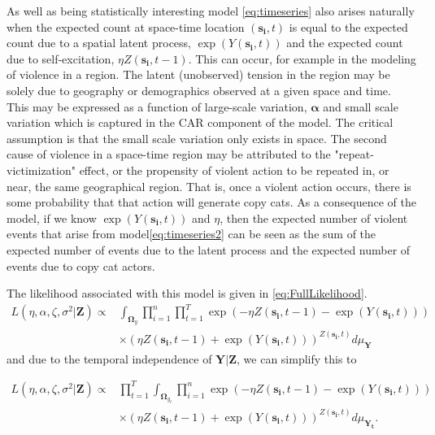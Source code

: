 \documentclass[11pt]{isuthesis}
\begin{document}
	As well as being statistically interesting model \eqref{eq:timeseries} also arises naturally when the expected count at space-time location $(\boldsymbol{s_i},t)$ is equal to the expected count due to a spatial latent process, $\exp(Y(\boldsymbol{s_i},t))$ and the expected count due to self-excitation, $\eta Z(\boldsymbol{s_i},t-1)$. This can occur, for example in the modeling of violence in a region.  The latent (unobserved) tension in the region may be solely due to geography or demographics observed at a given space and time.  This may be expressed as a function of large-scale variation, $\boldsymbol{\alpha}$ and small scale variation which is captured in the CAR component of the model.  The critical assumption is that the small scale variation only exists in space.  The second cause of violence in a space-time region may be attributed to the "repeat-victimization" effect, or the propensity of violent action to be repeated in, or near, the same geographical region.  That is, once a violent action occurs, there is some probability that that action will generate copy cats.  As a consequence of the model, if we know $\exp(Y(\boldsymbol{s_i},t))$ and $\eta$, then the expected number of violent events that arise from model\eqref{eq:timeseries2} can be seen as the sum of the expected number of events due to the latent process and the expected number of events due to copy cat actors.
	
	The likelihood associated with this model is given in \eqref{eq:FullLikelihood}.
	\begin{align}
	L(\eta,\alpha,\zeta,\sigma^2|\boldsymbol{Z}) \propto & \int_{\boldsymbol{\Omega}_y} \prod_{i=1}^{n}\prod_{t=1}^{T} \exp(-\eta Z(\boldsymbol{s_i},t-1)-\exp(Y(\boldsymbol{s_i},t)))\nonumber\\
	&\times \left(\eta Z(\boldsymbol{s_i},t-1)+\exp(Y(\boldsymbol{s_i},t))\right)^{Z(\boldsymbol{s_i},t)} d\mu_{\boldsymbol{Y}}\label{eq:FullLikelihood}
	\end{align}
	and due to the temporal independence of $\boldsymbol{Y}|\boldsymbol{Z}$, we can simplify this to
	
	\begin{align}
	L(\eta,\alpha,\zeta,\sigma^2|\boldsymbol{Z}) \propto & \prod_{t=1}^{T}\int_{\boldsymbol{\Omega}_{y_t}} \prod_{i=1}^{n} \exp(-\eta Z(\boldsymbol{s_i},t-1)-\exp(Y(\boldsymbol{s_i},t)))\nonumber\\
	&\times \left(\eta Z(\boldsymbol{s_i},t-1)+\exp(Y(\boldsymbol{s_i},t))\right)^{Z(\boldsymbol{s_i},t)} d\mu_{\boldsymbol{Y_t}}\label{eq:FullLikelihood2}.
	\end{align}
	
\end{document}
